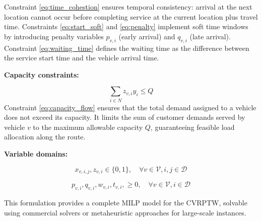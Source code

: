 Constraint \eqref{eq:time_cohestion} ensures temporal consistency: arrival at the next location cannot occur before completing service at the current location plus travel time. 
Constraints \eqref{eq:start_soft} and \eqref{eq:penalty} implement soft time windows by introducing penalty variables $p_{v,i}$ (early arrival) and $q_{v,i}$ (late arrival). 
Constraint \eqref{eq:waiting_time} defines the waiting time as the difference between the service start time and the vehicle arrival time.



\textbf{Capacity constraints:}



\begin{equation}\label{eq:capacity_flow}
    \sum_{i \in N}z_{v,i}y_i \leq Q
\end{equation}
Constraint \eqref{eq:capacity_flow} ensures that the total demand assigned to a vehicle does not exceed its capacity. 
It limits the sum of customer demands served by vehicle $v$ to the maximum allowable capacity $Q$, guaranteeing feasible load allocation along the route.

\textbf{Variable domains:}

\begin{equation}
     x_{v,i,j}, z_{v,i}\in\{0,1\}, \quad \forall v \in \mathcal{V}, i,j \in \mathcal{D}
\end{equation}

\begin{equation}
     p_{v,i}, q_{v,i}, w_{v,i}, t_{v,i}, \geq 0, \quad \forall v \in \mathcal{V}, i \in \mathcal{D}
\end{equation}

This formulation provides a complete MILP model for the CVRPTW, solvable using commercial solvers or metaheuristic approaches for large-scale instances.
